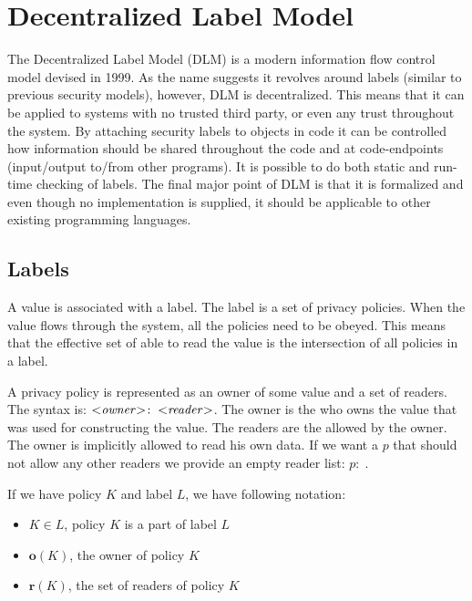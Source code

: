 
\newcommand{\policy}[2]{\ensuremath{#1\!:\;#2}}

\section{Decentralized Label Model}
The Decentralized Label Model (DLM) is a modern information flow control model devised in 1999.\cite{myers1999mostly}
As the name suggests it revolves around labels (similar to previous security models), however, DLM is decentralized.
This means that it can be applied to systems with no trusted third party, or even any trust throughout the system.
By attaching security labels to objects in code it can be controlled how information should be shared throughout the code and at code-endpoints (input/output to/from other programs).
It is possible to do both static and run-time checking of labels.
The final major point of DLM is that it is formalized and even though no implementation is supplied, it should be applicable to other existing programming languages.

\newcommand{\xvalue}{value}
\newcommand{\xvalues}{values}

\subsection{Labels}
A \xvalue{} is associated with a label.
The label is a set of privacy policies.
When the \xvalue{} flows through the system, all the policies need to be obeyed.
This means that the effective set of \principals{} able to read the \xvalue{} is the intersection of all policies in a label.

A privacy policy is represented as an owner of some \xvalue{} and a set of readers.
The syntax is: $\policy{\text{<\emph{owner}>}}{\text{<\emph{reader}>}}$.
The owner is the \principal{} who owns the \xvalue{} that was used for constructing the \xvalue{}.
The readers are the \principals{} allowed by the owner.
The owner is implicitly allowed to read his own data.
If we want a \principal{} $p$ that should not allow any other readers we provide an empty reader list: $\policy{p}{}$.

If we have policy $K$ and label $L$, we have following notation:
\begin{itemize}
\item $K \in L$, policy $K$ is a part of label $L$
\item $\textbf{o}(K)$, the owner of policy $K$
\item $\textbf{r}(K)$, the set of readers of policy $K$
\end{itemize}

